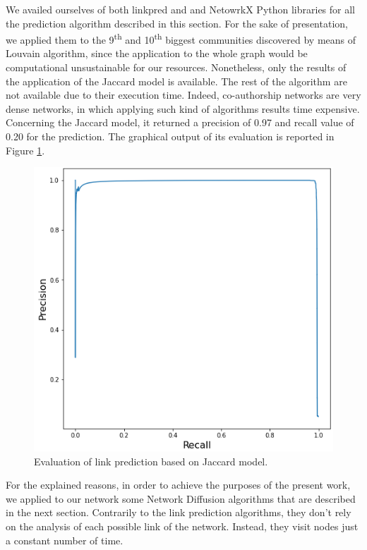 \documentclass[sigchi]{acmart}
\begin{document}
We availed ourselves of both linkpred and and NetowrkX \cite{networkX} Python libraries for all the prediction algorithm described in this section. For the sake of presentation, we applied them to the 9\textsuperscript{th} and 10\textsuperscript{th} biggest communities discovered by means of Louvain algorithm, since the application to the whole graph would be computational unsustainable for our resources. Nonetheless, only the results of the application of the Jaccard model is available. The rest of the algorithm are not available due to their execution time. Indeed, co-authorship networks are very dense networks, in which applying such kind of algorithms results time expensive. Concerning the Jaccard model, it returned a precision of 0.97 and recall value of 0.20 for the prediction. The graphical output of its evaluation is reported in Figure \ref{fig:jaccardEval}.\\

\begin{figure}[ht]
  \centering
  \includegraphics[width=0.8\linewidth]{report/img/jaccard.png}
  \caption{Evaluation of link prediction based on Jaccard model.}
  \label{fig:jaccardEval}
\end{figure}

For the explained reasons, in order to achieve the purposes of the present work, we applied to our network some Network Diffusion algorithms that are described in the next section. Contrarily to the link prediction algorithms, they don't rely on the analysis of each possible link of the network. Instead, they visit nodes just a constant number of time.
\end{document}
